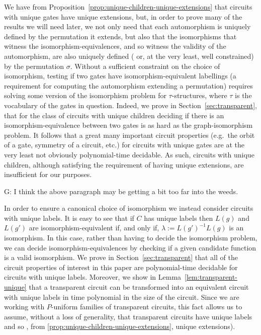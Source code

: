 \documentclass[../paper.tex]{subfiles}
\begin{document}
We have from Proposition~\ref{prop:unique-children-unique-extensions} that
circuits with unique gates have unique extensions, but, in order to prove many
of the results we will need later, we not only need that each automorphism is
uniquely defined by the permutation it extends, but also that the isomorphisms
that witness the isomorphism-equivalences, and so witness the validity of the
automorphism, are also uniquely defined ( or, at the very least, well
constrained) by the permutation $\sigma$. Without a sufficient constraint on the
choice of isomorphism, testing if two gates have isomorphism-equivalent
labellings (a requirement for computing the automorphism extending a
permutation) requires solving some version of the isomorphism problem for
$\tau$-structures, where $\tau$ is the vocabulary of the gates in question.
Indeed, we prove in Section~\ref{sec:transparent}, that for the class of
circuits with unique children deciding if there is an isomorphism-equivalence
between two gates is as hard as the graph-isomorphism problem. It follows that a
great many important circuit properties (e.g.\ the orbit of a gate, symmetry of a
circuit, etc.) for circuits with unique gates are at the very least not
obviously polynomial-time decidable.  As such, circuits with unique children,
although satisfying the requirement of having unique extensions, are
insufficient for our purposes.

\begin{drem}
  G: I think the above paragraph may be getting a bit too far into the weeds.
\end{drem}

In order to ensure a canonical choice of isomorphism we instead consider
circuits with unique labels. It is easy to see that if $C$ has unique labels
then $L(g)$ and $L(g')$ are isomorphism-equivalent if, and only if, $\lambda :=
L(g')^{-1}L(g)$ is an isomorphism. In this case, rather than having to decide
the isomorphism problem, we can decide isomorphism-equivalences by checking if a
given candidate function is a valid isomorphism. We prove in
Section~\ref{sec:transparent} that all of the circuit properties of interest in
this paper are polynomial-time decidable for circuits with unique labels.
Moreover, we show in Lemma~\ref{lem:transparent-unique} that a transparent
circuit can be transformed into an equivalent circuit with unique labels in time
polynomial in the size of the circuit. Since we are working with $P$-uniform
families of transparent circuits, this fact allows us to assume, without a loss
of generality, that transparent circuits have unique labels and so , from
\ref{prop:unique-children-unique-extensions}, unique extensions).
\end{document}
